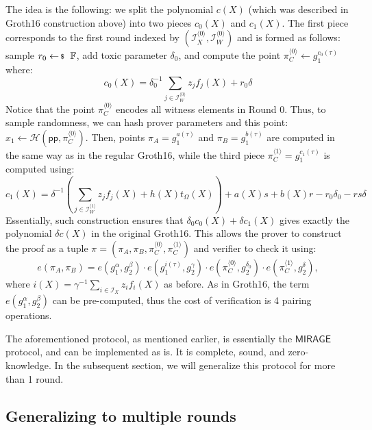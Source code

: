 \documentclass[../../book]{subfiles}
\begin{document}
The idea is the following: we split the polynomial $c(X)$ (which was described
in Groth16 construction above) into two pieces $c_0(X)$ and $c_1(X)$. The first
piece corresponds to the first round indexed by $(\mathcal{I}_X^{\langle 0
\rangle}, \mathcal{I}_W^{\langle 0 \rangle})$ and is formed as follows: sample
$r_0 \leftarrowS \mathbb{F}$, add toxic parameter $\delta_0$, and compute the point
$\pi_C^{\langle 0 \rangle} \gets g_1^{c_0(\tau)}$ where:
\[
c_0(X) = \delta_0^{-1}\sum_{j \in \mathcal{I}_W^{\langle 0 \rangle}} z_jf_j(X) + r_0\delta
\]
Notice that the point $\pi_C^{\langle 0 \rangle}$ encodes all witness elements
in Round 0. Thus, to sample randomness, we can hash prover parameters and this
point: $x_1 \gets \mathcal{H}(\mathsf{pp}, \pi_C^{\langle 0 \rangle})$. Then,
points $\pi_A=g_1^{a(\tau)}$ and $\pi_B=g_1^{b(\tau)}$ are computed in the same
way as in the regular Groth16, while the third piece $\pi_C^{\langle 1 \rangle}
= g_1^{c_1(\tau)}$ is computed using:
\[
c_1(X) = \delta^{-1}\left(\sum_{j \in \mathcal{I}_W^{\langle 1 \rangle}} z_jf_j(X)+h(X)t_{\Omega}(X)\right) + a(X)s + b(X)r - r_0\delta_0 - rs\delta
\]
Essentially, such construction ensures that $\delta_0c_0(X)+\delta c_1(X)$ gives
exactly the polynomial $\delta c(X)$ in the original Groth16. This allows the
prover to construct the proof as a tuple $\pi=(\pi_A,\pi_B,\pi_C^{\langle 0
\rangle},\pi_C^{\langle 1 \rangle})$ and verifier to check it using:
\[
e(\pi_A,\pi_B) = e(g_1^{\alpha},g_2^{\beta}) \cdot e(g_1^{i(\tau)},g_2^{\gamma}) \cdot e(\pi_C^{\langle 0 \rangle}, g_2^{\delta_0}) \cdot e(\pi_C^{\langle 1 \rangle}, g_2^{\delta}),
\]
where $i(X) = \gamma^{-1}\sum_{i \in \mathcal{I}_X}z_if_i(X)$ as before. As in
Groth16, the term $e(g_1^{\alpha}, g_2^{\beta})$ can be pre-computed, thus the
cost of verification is 4 pairing operations.

\begin{remark}
The aforementioned protocol, as mentioned earlier, is essentially the $\textsf{MIRAGE}$ protocol, and can be implemented as is. It is complete, sound, and zero-knowledge. In the subsequent section, we will generalize this protocol for more than 1 round.
\end{remark}

\subsection{Generalizing to multiple rounds}
\end{document}
